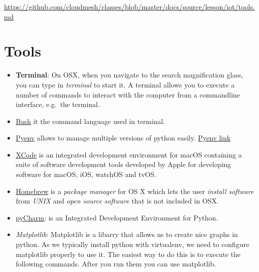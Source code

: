 \begin{fileremark}\url{https://github.com/cloudmesh/classes/blob/master/docs/source/lesson/iot/tools.md}\end{fileremark}
\section{Tools}\label{tools}

\begin{itemize}
\item
  \textbf{Terminal}: On OSX, when you navigate to the search
  magnification glass, you can type in \emph{terminal} to start it. A
  terminal allows you to execute a number of commands to interact with
  the computer from a commandline interface, e.g.~the terminal.
\item
  \href{https://linuxconfig.org/bash-scripting-tutorial}{Bash} it the
  command language used in terminal.
\item
  \href{https://cloudmesh.github.io/classes/lesson/prg/pyenv.html?highlight=xcode\#install-pyenv-on-osxhttps://cloudmesh.github.io/classes/lesson/prg/pyenv.html?highlight=xcode\#install-pyenv-on-osx}{Pyenv}
  allows to manage multiple versions of python easily.
  \href{https://github.com/pyenv/pyenv\#how-it-works}{Pyenv link}
\item
  \href{https://cloudmesh.github.io/classes/lesson/prg/pyenv.html?highlight=xcode\#install-pyenv-on-osxhttps://cloudmesh.github.io/classes/lesson/prg/pyenv.html?highlight=xcode\#install-pyenv-on-osx}{XCode}
  is an integrated development environment for macOS containing a suite
  of software development tools developed by Apple for developing
  software for macOS, iOS, watchOS and tvOS.
\item
  \href{https://brew.sh}{Homebrew} is a \emph{package manager} for OS X
  which lets the user \emph{install software} from \emph{UNIX} and
  \emph{open source software} that is not included in OSX.
\item
  \href{https://www.jetbrains.com/pycharm/download/download-thanks.html?platform=mac\&code=PCC}{pyCharm}:
  is an Integrated Development Environment for Python.
\item
  \emph{Matplotlib}: Matplotlib is a libarry that allows us to create
  nice graphs in python. As we typically install python with virtualenv,
  we need to configure matplotlib properly to use it. The easiest way to
  do this is to execute the following commands. After you run them you
  can use matplotlib.


\end{itemize}
